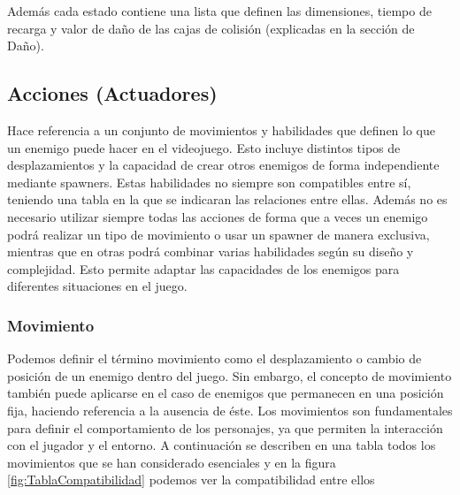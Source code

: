 Además cada estado contiene una lista que definen las dimensiones, tiempo de recarga y valor de daño de las cajas de colisión (explicadas en la sección de Daño).

\subsection{Acciones (Actuadores)}
Hace referencia a un conjunto de movimientos y habilidades que definen lo que un enemigo puede hacer en el videojuego. Esto incluye distintos tipos de desplazamientos y la capacidad de crear otros enemigos de forma independiente mediante spawners. Estas habilidades no siempre son compatibles entre sí, teniendo una tabla en la que se indicaran las relaciones entre ellas. Además no es necesario utilizar siempre todas las acciones de forma que a veces un enemigo podrá realizar un tipo de movimiento o usar un spawner de manera exclusiva, mientras que en otras podrá combinar varias habilidades según su diseño y complejidad. Esto permite adaptar las capacidades de los enemigos para diferentes situaciones en el juego.

\subsubsection{Movimiento}
Podemos definir el término movimiento como el desplazamiento o cambio de posición de un enemigo dentro del juego. Sin embargo, el concepto de movimiento también puede aplicarse en el caso de enemigos que permanecen en una posición fija, haciendo referencia a la ausencia de éste. Los movimientos son fundamentales para definir el comportamiento de los personajes, ya que permiten la interacción con el jugador y el entorno.
A continuación se describen en una tabla todos los movimientos que se han considerado esenciales y en la figura \ref{fig:TablaCompatibilidad} podemos ver la compatibilidad entre ellos

